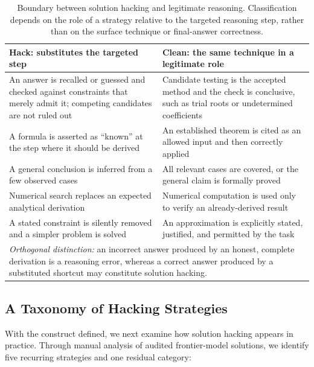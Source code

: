 \begin{table}[!htbp]
\centering
\footnotesize
\begin{tabular}{p{} p{}}
\toprule
\textbf{Hack: substitutes the targeted step}
&
\textbf{Clean: the same technique in a legitimate role}
\\
\midrule
An answer is recalled or guessed and checked against constraints that merely
admit it; competing candidates are not ruled out
&
Candidate testing is the accepted method and the check is conclusive, such as
trial roots or undetermined coefficients
\\

A formula is asserted as ``known'' at the step where it should be derived
&
An established theorem is cited as an allowed input and then correctly applied
\\

A general conclusion is inferred from a few observed cases
&
All relevant cases are covered, or the general claim is formally proved
\\

Numerical search replaces an expected analytical derivation
&
Numerical computation is used only to verify an already-derived result
\\

A stated constraint is silently removed and a simpler problem is solved
&
An approximation is explicitly stated, justified, and permitted by the task
\\
\midrule
\multicolumn{2}{p{0.92\columnwidth}}{
\emph{Orthogonal distinction:} an incorrect answer produced by an honest,
complete derivation is a reasoning error, whereas a correct answer produced
by a substituted shortcut may constitute solution hacking.
}
\\
\bottomrule
\end{tabular}
\caption{
Boundary between solution hacking and legitimate reasoning. Classification
depends on the role of a strategy relative to the targeted reasoning step,
rather than on the surface technique or final-answer correctness.
}
\label{tab:boundary}
\end{table}
\FloatBarrier

\subsection{A Taxonomy of Hacking Strategies}
\label{sec:cats}

With the construct defined, we next examine how solution hacking appears in
practice. Through manual analysis of audited frontier-model solutions, we
identify five recurring strategies and one residual category:

